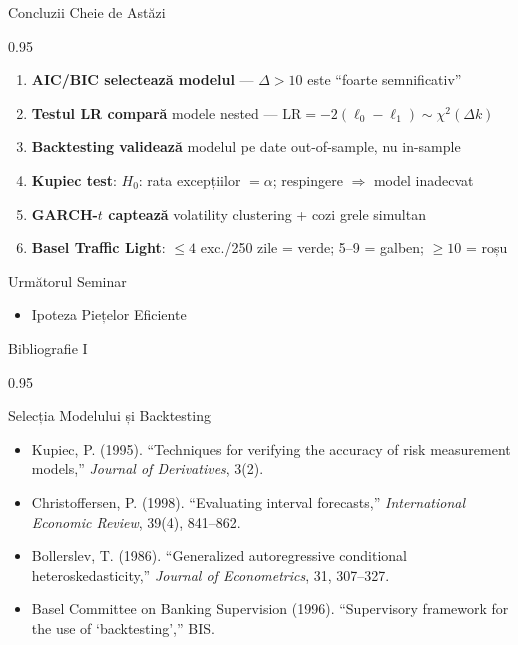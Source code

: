 \documentclass[9pt, aspectratio=169, t]{beamer}
\begin{document}
\begin{frame}{Concluzii Cheie de Astăzi}
    \begin{cminipage}{0.95\textwidth}
    \begin{enumerate}\setlength{\itemsep}{0pt}
        \item \textbf{AIC/BIC selectează modelul} --- $\Delta > 10$ este ``foarte semnificativ''
        \item \textbf{Testul LR compară} modele nested --- $\text{LR} = -2(\ell_0 - \ell_1) \sim \chi^2(\Delta k)$
        \item \textbf{Backtesting validează} modelul pe date out-of-sample, nu in-sample
        \item \textbf{Kupiec test}: $H_0$: rata excepțiilor $= \alpha$; respingere $\Rightarrow$ model inadecvat
        \item \textbf{GARCH-$t$ captează} volatility clustering + cozi grele simultan
        \item \textbf{Basel Traffic Light}: $\leq 4$ exc./250 zile = verde; 5--9 = galben; $\geq 10$ = roșu
    \end{enumerate}

    \vspace{0.3cm}
    \begin{block}{Următorul Seminar}
        \begin{itemize}\setlength{\itemsep}{0pt}
            \item Ipoteza Piețelor Eficiente
        \end{itemize}
    \end{block}
    \end{cminipage}
\end{frame}

\begin{frame}{Bibliografie I}
    \begin{cminipage}{0.95\textwidth}
    \begin{block}{Selecția Modelului și Backtesting}
        {\small
        \begin{itemize}\setlength{\itemsep}{0pt}
            \item Kupiec, P. (1995). ``Techniques for verifying the accuracy of risk measurement models,'' \textit{Journal of Derivatives}, 3(2).
            \item Christoffersen, P. (1998). ``Evaluating interval forecasts,'' \textit{International Economic Review}, 39(4), 841--862.
            \item Bollerslev, T. (1986). ``Generalized autoregressive conditional heteroskedasticity,'' \textit{Journal of Econometrics}, 31, 307--327.
            \item Basel Committee on Banking Supervision (1996). ``Supervisory framework for the use of `backtesting','' BIS.
        \end{itemize}
        }
    \end{block}
    \end{cminipage}
\end{frame}
\end{document}
